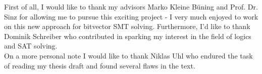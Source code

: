 \Abstract[\ackname]
First of all, I would like to thank my advisors Marko Kleine Büning and Prof. Dr. Sinz for allowing me to pursue this exciting project - I very much enjoyed to work on this new approach for bitvector SMT solving.
Furthermore, I'd like to thank Dominik Schreiber who contributed in sparking my interest in the field of logics and SAT solving.\\
On a more personal note I would like to thank Niklas Uhl who endured the task of reading my thesis draft and found several flaws in the text.